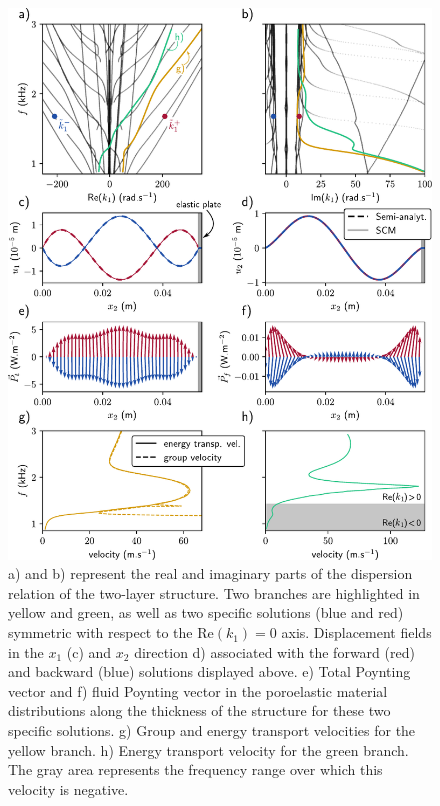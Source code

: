     \begin{figure}
        \centering
        \includegraphics[scale=.9]{chapitres/article_JAP/mode_shapes.pdf}
        \caption{a) and b) represent the real and imaginary parts of the dispersion relation of the two-layer structure. Two branches are highlighted in yellow and green, as well as two specific solutions (blue and red) symmetric with respect to the $\textrm{Re}\left( k_1\right)=0$ axis. Displacement fields in the $x_1$ (c) and $x_2$ direction d) associated with the forward (red) and backward (blue) solutions displayed above. e) Total Poynting vector and f) fluid Poynting vector in the poroelastic material distributions along the thickness of the structure for these two specific solutions. g) Group and energy transport velocities for the yellow branch. h) Energy transport velocity for the green branch. The gray area represents the frequency range over which this velocity is negative.}
        \label{fig:results}
    \end{figure}

